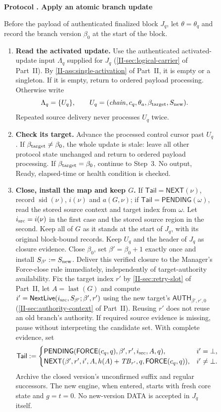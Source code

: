 \documentclass[11pt,a4paper]{article}
\newcommand{\TB}{\mathit{TB}}
\newcommand{\tagg}[1]{\ensuremath{\mathsf{#1}}}
\newcounter{protocol}
\newenvironment{protocol}[3][htbp]{\begin{figure}[#1]\refstepcounter{protocol}\label{#2}
\begin{mdframed}[linewidth=.6pt,skipabove=0pt,skipbelow=0pt,
innertopmargin=7pt,innerbottommargin=7pt]\small
\textbf{Protocol \theprotocol. #3}\par\smallskip}{\end{mdframed}\end{figure}}
\begin{document}
\begin{protocol}{alg:force}{Apply an atomic branch update}
Before the payload of authenticated finalized block $J_q$, let
$\theta=\theta_q$ and record the branch version $\beta_0$ at the start
of the block.
\begin{enumerate}[label=\textbf{\arabic*)},itemsep=3pt]
\item \textbf{Read the activated update.}
Use the authenticated activated-update input $\Lambda_q$ supplied for
$J_q$ (\cref{II-sec:logical-carrier} of Part~II). By \cref{II-ass:single-activation} of Part~II, it is empty
or a singleton. If it is empty, return to ordered payload processing.
Otherwise write
\[
 \Lambda_q=\{U_q\},\qquad
 U_q=(\mathit{chain},c_q,\theta_a,\beta_{\rm target},S_{\rm new}).
\]
Repeated source delivery never processes $U_q$ twice.

\item \textbf{Check its target.}
Advance the processed control cursor past $U_q$. If
$\beta_{\rm target}\ne\beta_0$, the whole update is stale: leave all
other protocol state unchanged and return to ordered payload processing. If
$\beta_{\rm target}=\beta_0$, continue to Step~3. No output, Ready,
elapsed-time or health condition is checked.

\item \textbf{Close, install the map and keep $G$.}
If $\mathsf{Tail}=\tagg{NEXT}(\nu)$, record
$\operatorname{sid}(\nu)$, $i(\nu)$ and $a(G,\nu)$; if
$\mathsf{Tail}=\tagg{PENDING}(\omega)$, read the stored source context
and target index from $\omega$.  Let $i_{\rm src}=i(\nu)$ in the first
case and the stored source region in the second. Keep all of $G$ as it
stands at the start of $J_q$, with its original block-bound records. Keep
$U_q$ and the header of $J_q$ as closure evidence. Close $\beta_0$, set
$\beta'=\beta_0+1$ exactly once and install
$S_{\beta'}:=S_{\rm new}$. Deliver this verified closure to the Manager's
Force-close rule immediately, independently of target-authority
availability. Fix the
target index $r'$ by \cref{II-sec:retry-slot} of Part~II, let
$A=\operatorname{last}(G)$ and compute
$i'=\tagg{NextLive}(i_{\rm src},S_{\beta'};\beta',r')$ using the new target's
$\tagg{AUTH}_{\beta',r',0}$ (\cref{II-sec:authority-context} of Part~II).
Reusing $r'$ does not reuse an old branch's authority. If required source
evidence is missing, pause without interpreting the candidate set. With complete evidence, set
\[
 \mathsf{Tail}:=
 \begin{cases}
 \tagg{PENDING}(\tagg{FORCE}(c_q,q),\beta',r',i_{\rm src},A,q),
   & i'=\bot,\\
 \tagg{NEXT}(\beta',r',i',A,h(A)+\TB_{r'},q,
              \tagg{FORCE}(c_q,q)),& i'\ne\bot.
 \end{cases}
\]
Archive the closed version's unconfirmed suffix and regular successors.
The new engine, when entered, starts with fresh core state and $g=t=0$.
No new-version DATA is accepted in $J_q$ itself.


\end{enumerate}
\end{protocol}
\end{document}

